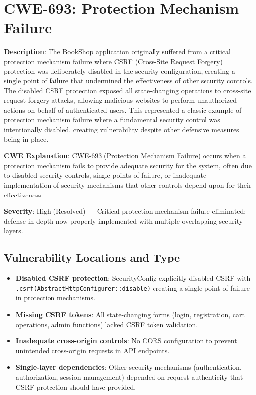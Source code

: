 \documentclass[]{UCD_CS_FYP_Report}
\begin{document}
\section{CWE-693: Protection Mechanism Failure}

\textbf{Description}: The BookShop application originally suffered from a critical protection mechanism failure where CSRF (Cross-Site Request Forgery) protection was deliberately disabled in the security configuration, creating a single point of failure that undermined the effectiveness of other security controls. The disabled CSRF protection exposed all state-changing operations to cross-site request forgery attacks, allowing malicious websites to perform unauthorized actions on behalf of authenticated users. This represented a classic example of protection mechanism failure where a fundamental security control was intentionally disabled, creating vulnerability despite other defensive measures being in place.

\textbf{CWE Explanation}: CWE-693 (Protection Mechanism Failure) occurs when a protection mechanism fails to provide adequate security for the system, often due to disabled security controls, single points of failure, or inadequate implementation of security mechanisms that other controls depend upon for their effectiveness.

\textbf{Severity}: High (Resolved) — Critical protection mechanism failure eliminated; defense-in-depth now properly implemented with multiple overlapping security layers.

\subsection*{Vulnerability Locations and Type}
\begin{itemize}
	\item \textbf{Disabled CSRF protection}: SecurityConfig explicitly disabled CSRF with \texttt{.csrf(AbstractHttpConfigurer::disable)} creating a single point of failure in protection mechanisms.
	\item \textbf{Missing CSRF tokens}: All state-changing forms (login, registration, cart operations, admin functions) lacked CSRF token validation.
	\item \textbf{Inadequate cross-origin controls}: No CORS configuration to prevent unintended cross-origin requests in API endpoints.
	\item \textbf{Single-layer dependencies}: Other security mechanisms (authentication, authorization, session management) depended on request authenticity that CSRF protection should have provided.
\end{itemize}
\end{document}
